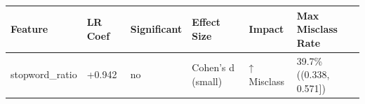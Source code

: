 \begin{tabular}{llllll}
\toprule
Feature & LR Coef & Significant & Effect Size & Impact & Max Misclass Rate \\
\midrule
stopword\_ratio & +0.942 & no & Cohen's d (small) & ↑ Misclass & 39.7\% ((0.338, 0.571]) \\
\bottomrule
\end{tabular}
